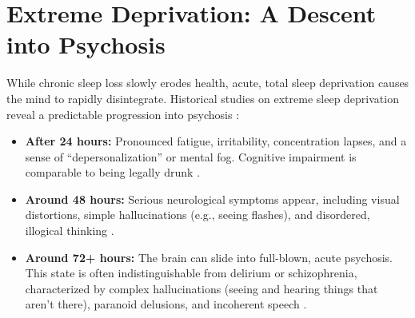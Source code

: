 \section{Extreme Deprivation: A Descent into Psychosis}\label{sec:psychosis}

While chronic sleep loss slowly erodes health, acute, total sleep deprivation causes the mind to rapidly disintegrate. Historical studies on extreme sleep deprivation reveal a predictable progression into psychosis \citep{waters2018deprivation}:

\begin{itemize}
    \item \textbf{After 24 hours:} Pronounced fatigue, irritability, concentration lapses, and a sense of ``depersonalization'' or mental fog. Cognitive impairment is comparable to being legally drunk \citep{waters2018deprivation}.
    \item \textbf{Around 48 hours:} Serious neurological symptoms appear, including visual distortions, simple hallucinations (e.g., seeing flashes), and disordered, illogical thinking \citep{waters2018deprivation}.
    \item \textbf{Around 72+ hours:} The brain can slide into full-blown, acute psychosis. This state is often indistinguishable from delirium or schizophrenia, characterized by complex hallucinations (seeing and hearing things that aren't there), paranoid delusions, and incoherent speech \citep{waters2018deprivation}.
\end{itemize}